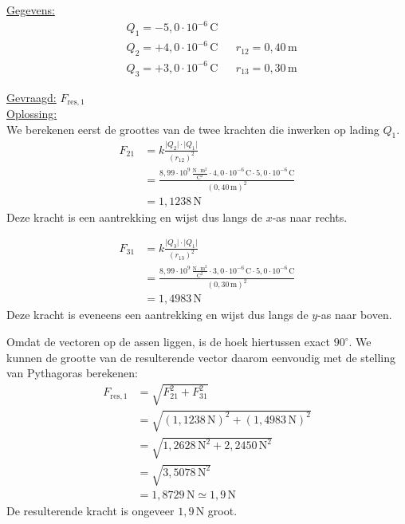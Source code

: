 \documentclass{ximera}
\begin{document}
\begin{exercise}
    \begin{solution}\nl
        \underline{Gegevens:}
        \begin{align*}
            & Q_{1} = -5{,}0 \cdot 10^{-6} \, \mathrm{C} & & \\
            & Q_{2} = +4{,}0 \cdot 10^{-6} \, \mathrm{C} & & r_{12} = 0{,}40 \, \mathrm{m}\\
            & Q_{3} = +3{,}0 \cdot 10^{-6} \, \mathrm{C} & & r_{13} = 0{,}30 \, \mathrm{m}
        \end{align*}

        \underline{Gevraagd:} $F_{\text{res},1}$\\ 

        \underline{Oplossing:}\\
        We berekenen eerst de groottes van de twee krachten die inwerken op lading $Q_{1}$.
        \begin{align*}
            F_{21} &= k\frac{\lvert Q_{2}\rvert\cdot\lvert Q_{1}\rvert}{(r_{12})^{2}} \\
            &= \frac{8{,}99 \cdot 10^9 \, \mathrm{\frac{N \cdot m^2}{C^2}} \cdot 4{,}0 \cdot 10^{-6} \, \mathrm{C} \cdot 5{,}0 \cdot 10^{-6} \, \mathrm{C}}{(0{,}40 \, \mathrm{m})^{2}} \\
            &= 1{,}1238 \, \mathrm{N}
        \end{align*}
        Deze kracht is een aantrekking en wijst dus langs de $x$-as naar rechts.
        
        \begin{align*}
            F_{31} &= k\frac{\lvert Q_{3}\rvert\cdot\lvert Q_{1}\rvert}{(r_{13})^{2}} \\
            &= \frac{8{,}99 \cdot 10^9 \, \mathrm{\frac{N \cdot m^2}{C^2}} \cdot 3{,}0 \cdot 10^{-6} \, \mathrm{C} \cdot 5{,}0 \cdot 10^{-6} \, \mathrm{C}}{(0{,}30 \, \mathrm{m})^{2}} \\
            &= 1{,}4983 \, \mathrm{N}
        \end{align*}
        Deze kracht is eveneens een aantrekking en wijst dus langs de $y$-as naar boven.

        Omdat de vectoren op de assen liggen, is de hoek hiertussen exact $90^\circ$. We kunnen de grootte van de resulterende vector daarom eenvoudig met de stelling van Pythagoras berekenen:
        \begin{align*}
            F_{\text{res},1} &= \sqrt{F_{21}^{2} + F_{31}^{2}} \\
            &= \sqrt{(1{,}1238 \, \mathrm{N})^{2} + (1{,}4983 \, \mathrm{N})^{2}} \\
            &= \sqrt{1{,}2628\, \mathrm{N}^2 + 2{,}2450\, \mathrm{N}^2} \\
            &= \sqrt{3{,}5078\, \mathrm{N}^2} \\
            &= 1{,}8729 \, \mathrm{N} \simeq \boxed{1{,}9 \, \mathrm{N}}
        \end{align*}
        De resulterende kracht is ongeveer $1{,}9 \, \mathrm{N}$ groot.
    \end{solution}
\end{exercise}
\end{document}
